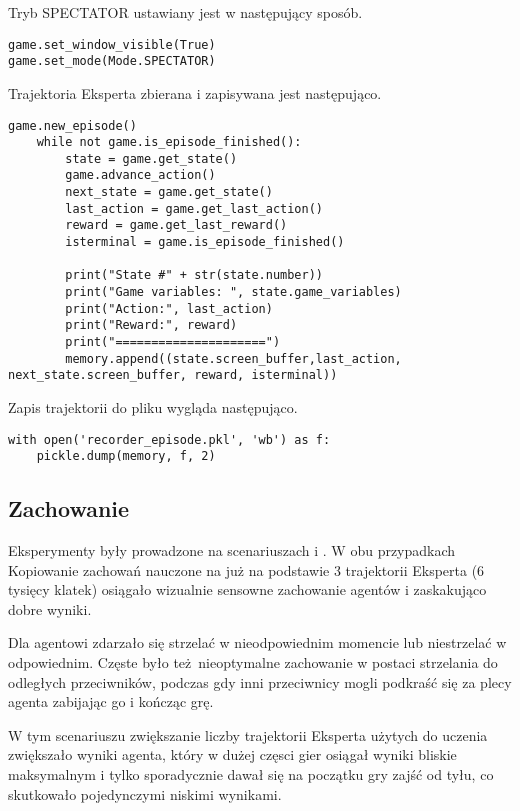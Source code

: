\vspace{5mm}

Tryb SPECTATOR ustawiany jest w następujący sposób.
\begin{lstlisting}[language=iPython]
game.set_window_visible(True)
game.set_mode(Mode.SPECTATOR)
\end{lstlisting}

Trajektoria Eksperta zbierana i zapisywana jest następująco.

\begin{lstlisting}[language=iPython]
    game.new_episode()
    while not game.is_episode_finished():
        state = game.get_state()
        game.advance_action()
        next_state = game.get_state()
        last_action = game.get_last_action()
        reward = game.get_last_reward()
        isterminal = game.is_episode_finished()

        print("State #" + str(state.number))
        print("Game variables: ", state.game_variables)
        print("Action:", last_action)
        print("Reward:", reward)
        print("=====================")
        memory.append((state.screen_buffer,last_action, next_state.screen_buffer, reward, isterminal))
\end{lstlisting}

Zapis trajektorii do pliku wygląda następująco.

\begin{lstlisting}[language=iPython]
with open('recorder_episode.pkl', 'wb') as f:
    pickle.dump(memory, f, 2)
\end{lstlisting}

\subsection{Zachowanie}
Eksperymenty były prowadzone na scenariuszach  i .
W obu przypadkach Kopiowanie zachowań nauczone na już na podstawie 3 trajektorii Eksperta (6 tysięcy klatek) osiągało wizualnie sensowne zachowanie agentów i zaskakująco dobre wyniki.

Dla  agentowi zdarzało się strzelać w nieodpowiednim momencie lub niestrzelać w odpowiednim. Częste było też nieoptymalne zachowanie w postaci strzelania do odległych przeciwników, podczas gdy inni przeciwnicy mogli podkraść się za plecy agenta zabijając go i kończąc grę.

W tym scenariuszu zwiększanie liczby trajektorii Eksperta użytych do uczenia zwiększało wyniki agenta, który w dużej częsci gier osiągał wyniki bliskie maksymalnym i tylko sporadycznie dawał się na początku gry zajść od tyłu, co skutkowało pojedynczymi niskimi wynikami.

